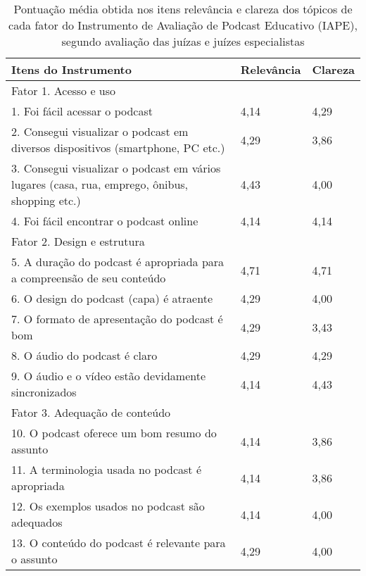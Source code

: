 \begin{table}[htpb]
\small
\centering
\begin{threeparttable}
\caption{Pontuação média obtida nos itens relevância e clareza dos tópicos de cada fator do Instrumento de Avaliação de Podcast Educativo (IAPE), segundo avaliação das juízas e juízes especialistas}
\label{tab-01}
\begin{tabular}{p{10cm} l l}
\toprule
Itens do Instrumento & Relevância & Clareza \\
\midrule

Fator 1. Acesso e uso &  &  \\
1. Foi fácil acessar o podcast & 4,14 & 4,29 \\
2. Consegui visualizar o podcast em diversos dispositivos (smartphone, PC etc.) & 4,29 & 3,86 \\
3. Consegui visualizar o podcast em vários lugares (casa, rua, emprego, ônibus, shopping etc.) & 4,43 & 4,00 \\
4. Foi fácil encontrar o podcast online & 4,14 & 4,14 \\
		
Fator 2. Design e estrutura &  &  \\	
5. A duração do podcast é apropriada para a compreensão de seu conteúdo & 4,71 & 4,71 \\
6. O design do podcast (capa) é atraente & 4,29 & 4,00 \\
7. O formato de apresentação do podcast é bom & 4,29 & 3,43 \\
8. O áudio do podcast é claro & 4,29 & 4,29 \\
9. O áudio e o vídeo estão devidamente sincronizados & 4,14 & 4,43 \\
		
Fator 3. Adequação de conteúdo &  &  \\
10. O podcast oferece um bom resumo do assunto & 4,14 & 3,86 \\
11. A terminologia usada no podcast é apropriada & 4,14 & 3,86 \\
12. Os exemplos usados no podcast são adequados & 4,14 & 4,00 \\
13. O conteúdo do podcast é relevante para o assunto & 4,29 & 4,00 \\
		

\end{tabular}
\end{threeparttable}
\end{table}
